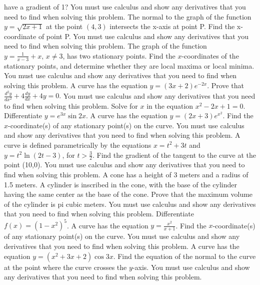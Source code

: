 \documentclass[12pt,addpoints]{exam}
\begin{document}
\begin{questions}
have a gradient of 1? You must use calculus and show any derivatives that you need to find when solving this problem.
\fillwithlines{5cm}
\question[5] The normal to the graph of the function \( y = \sqrt{2x+1} \) at the point \( (4,3) \) intersects the x-axis at point P. Find the x-coordinate of point P. You must use calculus and show any derivatives that you need to find when solving this problem.
\fillwithlines{5cm}
\question[5] The graph of the function \( y = \frac{1}{x-3} + x, \, x \neq 3 \), has two stationary points. Find the \( x \)-coordinates of the stationary points, and determine whether they are local maxima or local minima. You must use calculus and show any derivatives that you need to find when solving this problem.
\fillwithlines{5cm}
\question[5] A curve has the equation \( y = (3x + 2)e^{-2x} \). Prove that \(\frac{d^2 y}{dx^2} + 4 \frac{dy}{dx} + 4y = 0.\) You must use calculus and show any derivatives that you need to find when solving this problem.
\fillwithlines{5cm}
\question[5] Solve for \(x\) in the equation \(x^2 - 2x + 1 = 0\).
\fillwithlines{5cm}
\question[5] Differentiate \( y = e^{3x} \sin 2x \).
\fillwithlines{5cm}
\question[5] A curve has the equation \( y = (2x + 3)e^{x^2} \). Find the \( x \)-coordinate(s) of any stationary point(s) on the curve. You must use calculus and show any derivatives that you need to find when solving this problem.
\fillwithlines{5cm}
\question[5] A curve is defined parametrically by the equations \( x = t^2 + 3t \) and \( y = t^2 \ln(2t - 3) \), for \( t > \frac{3}{2} \). Find the gradient of the tangent to the curve at the point (10,0). You must use calculus and show any derivatives that you need to find when solving this problem.
\fillwithlines{5cm}
\question[5] A cone has a height of 3 meters and a radius of 1.5 meters. A cylinder is inscribed in the cone, with the base of the cylinder having the same center as the base of the cone. Prove that the maximum volume of the cylinder is pi cubic meters. You must use calculus and show any derivatives that you need to find when solving this problem.
\fillwithlines{5cm}
\question[5] Differentiate \( f(x) = (1 - x^2)^5 \).
\fillwithlines{5cm}
\question[5] A curve has the equation \( y = \frac{x^2}{x+1} \). Find the \( x \)-coordinate(s) of any stationary point(s) on the curve. You must use calculus and show any derivatives that you need to find when solving this problem.
\fillwithlines{5cm}
\question[5] A curve has the equation \( y = (x^2 + 3x + 2) \cos 3x \). Find the equation of the normal to the curve at the point where the curve crosses the \( y \)-axis. You must use calculus and show any derivatives that you need to find when solving this problem.

\end{questions}
\end{document}
